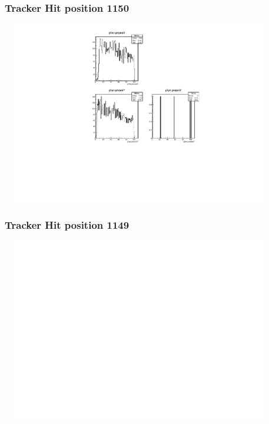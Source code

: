 \documentclass[slidestop,compress,mathserif]{beamer}
\begin{document}
\begin{frame}\frametitle{Tracker Hit position 1150}
	 \includegraphics[width=12cm,height=8cm]{Tracker_Hit_position_1150.pdf}
\end{frame}
\begin{frame}\frametitle{Tracker Hit position 1149}
	 \includegraphics[width=12cm,height=8cm]{Tracker_Hit_position_1149.pdf}
\end{frame}
\end{document}
